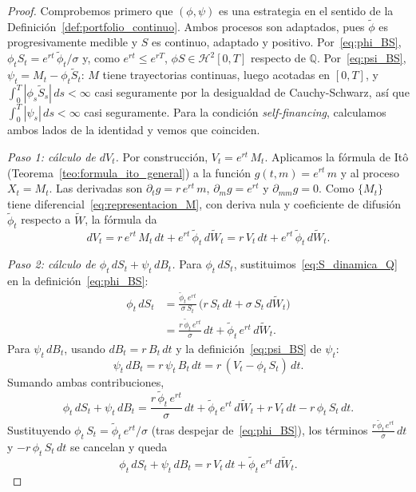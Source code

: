 \documentclass[11pt,a4paper,oneside]{report}
\theoremstyle{plain}
\theoremstyle{definition}
\theoremstyle{remark}
\newcommand{\Q}{\mathbb{Q}}
\newcommand{\1}{\mathbf{1}}
\begin{document}
\begin{proof}
Comprobemos primero que $(\phi, \psi)$ es una estrategia en el sentido de la Definición~\ref{def:portfolio_continuo}. Ambos procesos son adaptados, pues $\widetilde\phi$ es progresivamente medible y $S$ es continuo, adaptado y positivo. Por~\eqref{eq:phi_BS}, $\phi_t S_t = e^{rt}\, \widetilde\phi_t / \sigma$ y, como $e^{rt} \le e^{rT}$, $\phi S \in \mathcal{H}^2[0, T]$ respecto de $\Q$. Por~\eqref{eq:psi_BS}, $\psi_t = M_t - \phi_t \widetilde S_t$: $M$ tiene trayectorias continuas, luego acotadas en $[0, T]$, y $\int_0^T |\phi_s \widetilde S_s|\, ds < \infty$ casi seguramente por la desigualdad de Cauchy-Schwarz, así que $\int_0^T |\psi_s|\, ds < \infty$ casi seguramente. Para la condición \emph{self-financing}, calculamos ambos lados de la identidad y vemos que coinciden.

\emph{Paso 1: cálculo de $dV_t$.} Por construcción, $V_t = e^{rt}\,
M_t$. Aplicamos la fórmula de Itô (Teorema~\ref{teo:formula_ito_general})
a la función $g(t, m) = e^{rt}\, m$ y al proceso $X_t = M_t$. Las
derivadas son $\partial_t g = r\, e^{rt}\, m$, $\partial_m g = e^{rt}$
y $\partial_{mm} g = 0$. Como $\{M_t\}$ tiene
diferencial~\eqref{eq:representacion_M}, con deriva nula y coeficiente de
difusión $\widetilde\phi_t$ respecto a $\widetilde W$, la fórmula da
\begin{equation}\label{eq:dV_calculado}
  dV_t = r\, e^{rt}\, M_t\, dt + e^{rt}\, \widetilde\phi_t\, d\widetilde W_t
       = r\, V_t\, dt + e^{rt}\, \widetilde\phi_t\, d\widetilde W_t.
\end{equation}

\emph{Paso 2: cálculo de $\phi_t\, dS_t + \psi_t\, dB_t$.}
Para $\phi_t\, dS_t$, sustituimos~\eqref{eq:S_dinamica_Q} en la
definición~\eqref{eq:phi_BS}:
\begin{align*}
  \phi_t\, dS_t
  &= \frac{\widetilde\phi_t\, e^{rt}}{\sigma\, S_t}\,
     \bigl(r\, S_t\, dt + \sigma\, S_t\, d\widetilde W_t\bigr) \\
  &= \frac{r\, \widetilde\phi_t\, e^{rt}}{\sigma}\, dt
   + \widetilde\phi_t\, e^{rt}\, d\widetilde W_t.
\end{align*}
Para $\psi_t\, dB_t$, usando $dB_t = r\, B_t\, dt$ y la
definición~\eqref{eq:psi_BS} de $\psi_t$:
\begin{equation*}
  \psi_t\, dB_t = r\, \psi_t\, B_t\, dt
              = r\, (V_t - \phi_t\, S_t)\, dt.
\end{equation*}
Sumando ambas contribuciones,
\begin{equation*}
  \phi_t\, dS_t + \psi_t\, dB_t
  = \frac{r\, \widetilde\phi_t\, e^{rt}}{\sigma}\, dt
   + \widetilde\phi_t\, e^{rt}\, d\widetilde W_t
   + r\, V_t\, dt - r\, \phi_t\, S_t\, dt.
\end{equation*}
Sustituyendo $\phi_t\, S_t = \widetilde\phi_t\, e^{rt} / \sigma$
(tras despejar de~\eqref{eq:phi_BS}), los términos
$\frac{r\, \widetilde\phi_t\, e^{rt}}{\sigma}\, dt$ y $-r\, \phi_t\,
S_t\, dt$ se cancelan y queda
\begin{equation}\label{eq:dV_self_financing}
  \phi_t\, dS_t + \psi_t\, dB_t
  = r\, V_t\, dt + \widetilde\phi_t\, e^{rt}\, d\widetilde W_t.
\end{equation}


\end{proof}
\end{document}
